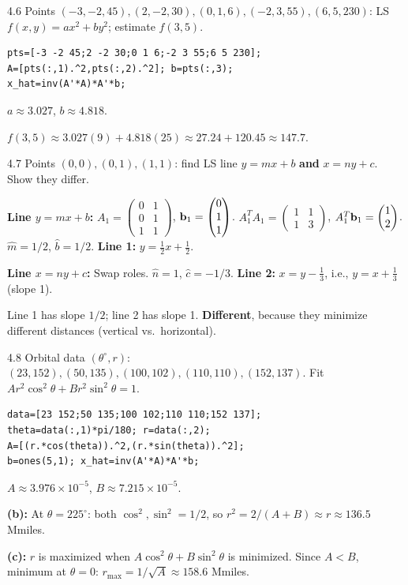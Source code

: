 \begin{exercise}{4.6}
Points $(-3,-2,45),(2,-2,30),(0,1,6),(-2,3,55),(6,5,230)$: LS $f(x,y)=ax^2+by^2$; estimate $f(3,5)$.
\end{exercise}
\begin{solution}
\begin{lstlisting}
pts=[-3 -2 45;2 -2 30;0 1 6;-2 3 55;6 5 230];
A=[pts(:,1).^2,pts(:,2).^2]; b=pts(:,3);
x_hat=inv(A'*A)*A'*b;
\end{lstlisting}
$a\approx3.027$, $b\approx4.818$.

$f(3,5)\approx3.027(9)+4.818(25)\approx27.24+120.45\approx147.7$.
\end{solution}

\begin{exercise}{4.7}
Points $(0,0),(0,1),(1,1)$: find LS line $y=mx+b$ \textbf{and} $x=ny+c$. Show they differ.
\end{exercise}
\begin{solution}
\textbf{Line $y=mx+b$:} $A_1=\begin{pmatrix}0&1\\0&1\\1&1\end{pmatrix}$, $\mathbf{b}_1=\begin{pmatrix}0\\1\\1\end{pmatrix}$.
$A_1^TA_1=\begin{pmatrix}1&1\\1&3\end{pmatrix}$, $A_1^T\mathbf{b}_1=\begin{pmatrix}1\\2\end{pmatrix}$. $\hat{m}=1/2$, $\hat{b}=1/2$. \textbf{Line 1:} $y=\tfrac{1}{2}x+\tfrac{1}{2}$.

\textbf{Line $x=ny+c$:} Swap roles. $\hat{n}=1$, $\hat{c}=-1/3$. \textbf{Line 2:} $x=y-\tfrac{1}{3}$, i.e., $y=x+\tfrac{1}{3}$ (slope 1).

Line 1 has slope $1/2$; line 2 has slope 1. \textbf{Different}, because they minimize different distances (vertical vs.\ horizontal).
\end{solution}

\begin{exercise}{4.8}
Orbital data $(\theta^\circ, r)$: $(23,152),(50,135),(100,102),(110,110),(152,137)$. Fit $Ar^2\cos^2\theta+Br^2\sin^2\theta=1$.
\end{exercise}
\begin{solution}
\begin{lstlisting}
data=[23 152;50 135;100 102;110 110;152 137];
theta=data(:,1)*pi/180; r=data(:,2);
A=[(r.*cos(theta)).^2,(r.*sin(theta)).^2];
b=ones(5,1); x_hat=inv(A'*A)*A'*b;
\end{lstlisting}
$A\approx3.976\times10^{-5}$, $B\approx7.215\times10^{-5}$.

\textbf{(b):} At $\theta=225^\circ$: both $\cos^2,\sin^2=1/2$, so $r^2=2/(A+B)\approx r\approx136.5$ Mmiles.

\textbf{(c):} $r$ is maximized when $A\cos^2\theta+B\sin^2\theta$ is minimized. Since $A<B$, minimum at $\theta=0$: $r_{\max}=1/\sqrt{A}\approx158.6$ Mmiles.
\end{solution}

